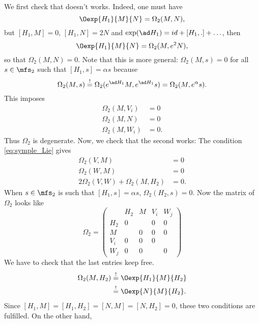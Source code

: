 We first check that
doesn't works.
Indeed, one must have
\[
	\Oexp{H_1}{M}{N}=\Omega_2(M,N),
\]
but $[H_1,M]=0$, $[H_1,N]=2N$ and $\exp(\ad H_1)=id+[H_1,.]+\ldots$, then
\[
	\Oexp{H_1}{M}{N}=\Omega_2(M,e^2N),
\]
so that $\Omega_2(M,N)=0$.
Note that this is more general: $\Omega_2(M,s)=0$ for all $s\in\mfs_2$ such that $[H_1,s]=\alpha s$ because
\[
	\Omega_2(M,s)\stackrel{!}{=}\Omega_2(e^{\ad H_1}M,e^{\ad H_1}s)=\Omega_2(M,e^{\alpha}s).
\]
This imposes
\begin{equation}
	\begin{split}
		\Omega_2(M,V_i)&=0\\
		\Omega_2(M,N)&=0\\
		\Omega_2(M,W_i)&=0.
	\end{split}
\end{equation}
Thus $\Omega_2$ is degenerate. Now, we check that the second works:
The condition \eqref{eq:symple_Lie} gives
\begin{equation}
	\begin{split}
		\Omega_2(V,M)&=0\\
		\Omega_2(W,M)&=0\\
		2\Omega_2(V,W)+\Omega_2(M,H_2)&=0.
	\end{split}
\end{equation}
When $s\in\mfs_2$ is such that $[H_1,s]=\alpha s$, $\Omega_2(H_2,s)=0$. Now the matrix of $\Omega_2$ looks like
\begin{equation}
	\Omega_2=\left(
	\begin{array}{c|c|c|c|c}
		    & H_2 & M & V_i & W_j \\
		\hline
		H_2 & 0   &   & 0   & 0   \\
		\hline
		M   &     & 0 & 0   & 0   \\
		\hline
		V_i & 0   & 0 & 0   &     \\
		\hline
		W_j & 0   & 0 &     & 0
	\end{array}
	\right)
\end{equation}
We have to check that the last entries keep free.
\begin{equation} \begin{split}
		\Omega_2(M,H_2)&\stackrel{!}{=}\Oexp{H_1}{M}{H_2}\\
		&\stackrel{!}{=}\Oexp{N}{M}{H_2}.
	\end{split}
\end{equation}
Since $[H_1,M]=[H_1,H_2]=[N,M]=[N,H_2]=0$, these two conditions are fulfilled. On the other hand,
